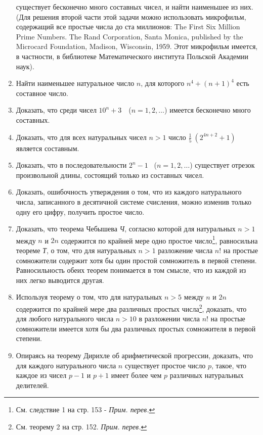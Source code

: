 \documentclass[12pt, a4paper, openany]{book}
\begin{document}
\begin{enumerate}
	существует бесконечно много составных чисел, и найти наименьшее из них. (Для решения второй части этой задачи можно использовать микрофильм, содержащий все простые числа до ста миллионов: The First Six Million Prime Numbers. The Rand Corporation, Santa Monica, published by the Microcard Foundation, Madison, Wisconsin, 1959. Этот микрофильм имеется, в частности, в библиотеке Математического института Польской Академии наук).
	\item Найти наименьшее натуральное число $n$, для которого $n^4+(n+1)^4$ есть составное число.
	\item Доказать, что среди чисел $10^n+3$\ \ ($n=1,2,\dots$) имеется бесконечно много составных.
	\item Доказать, что для всех натуральных чисел $n>1$ число $\displaystyle\frac{1}{5}\ (2^{4n+2}+1)$ является составным.
	\item Доказать, что в последовательности $2^n-1$ \ ($n=1,2, \dots$) существует отрезок произвольной длины, состоящий только из составных чисел.
	\item Доказать, ошибочность утверждения о том, что из каждого натурального числа, записанного в десятичной системе счисления, можно изменив только одну его цифру, получить простое число.
	\item Доказать, что теорема Чебышева \textit{Ч}, согласно которой для натуральных $n>1$ между $n$ и $2n$ содержится по крайней мере одно простое число\footnote{См. следствие 1 на стр. 153 - \textit{Прим. перев.}}, равносильна теореме \textit{Т}, о том, что для натуральных $n>1$  разложение числа $n!$ на простые сомножители содержит хотя бы один простой сомножитель в первой степени. Равносильность обеих теорем понимается в том смысле, что из каждой из них легко выводится другая.
	\item Используя теорему о том, что для натуральных $n>5$ между $n$ и $2n$ содержится по крайней мере два различных простых числа\footnote{См. теорему 2 на стр. 152. \textit{Прим. перев.}}, доказать, что для любого натурального числа $n>10$ в разложении числа $n!$ на простые сомножители имеется хотя бы два различных простых сомножителя в первой степени.
	\item Опираясь на теорему Дирихле об арифметической прогрессии, доказать, что для каждого натурального числа $n$ существует простое число $p$, такое, что каждое из чисел $p-1$ и $p+1$ имеет более чем $p$ различных натуральных делителей.
	
\end{enumerate}
\end{document}
